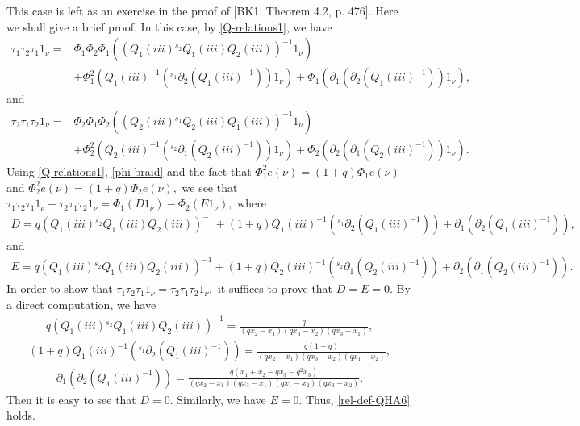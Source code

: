 \documentclass[11pt, reqno]{amsart} \textwidth=14.9cm \oddsidemargin=1cm \evensidemargin=1cm
\theoremstyle{definition}
\numberwithin{equation}{section}
\begin{document}
\vspace{0.3cm}\noindent This case is left as an exercise in the proof of [BK1, Theorem 4.2, p. 476]. Here we shall give a brief proof. In this case, by \eqref{Q-relations1}, we have
\begin{align*}
\tau_{1}\tau_{2}\tau_{1}1_{\nu}=&\Phi_{1}\Phi_{2}\Phi_{1}((Q_{1}(iii){}^{s_{2}}Q_{1}(iii)Q_{2}(iii))^{-1}1_{\nu})\\
&+\Phi_{1}^{2}(Q_{1}(iii)^{-1}({}^{s_{1}}\partial_{2}(Q_1(iii)^{-1}))1_{\nu})+\Phi_{1}(\partial_{1}(\partial_{2}(Q_1(iii)^{-1}))1_{\nu}),
\end{align*}
and
\begin{align*}
\tau_{2}\tau_{1}\tau_{2}1_{\nu}=&\Phi_{2}\Phi_{1}\Phi_{2}((Q_{2}(iii){}^{s_{1}}Q_{2}(iii)Q_{1}(iii))^{-1}1_{\nu})\\
&+\Phi_{2}^{2}(Q_{2}(iii)^{-1}({}^{s_{2}}\partial_{1}(Q_2(iii)^{-1}))1_{\nu})+\Phi_{2}(\partial_{2}(\partial_{1}(Q_2(iii)^{-1}))1_{\nu}).
\end{align*}
Using \eqref{Q-relations1}, \eqref{phi-braid} and the fact that $\Phi_{1}^{2}e(\nu)=(1+q)\Phi_{1}e(\nu)$ and $\Phi_{2}^{2}e(\nu)=(1+q)\Phi_{2}e(\nu),$ we see that $\tau_{1}\tau_{2}\tau_{1}1_{\nu}-\tau_{2}\tau_{1}\tau_{2}1_{\nu}=\Phi_{1}(D1_{\nu})-\Phi_{2}(E1_{\nu}),$
where
\begin{align*}
D=q(Q_{1}(iii){}^{s_{2}}Q_{1}(iii)Q_{2}(iii))^{-1}+(1+q)Q_{1}(iii)^{-1}({}^{s_{1}}\partial_{2}(Q_1(iii)^{-1}))
+\partial_{1}(\partial_{2}(Q_1(iii)^{-1})),
\end{align*}
and
\begin{align*}
E=q(Q_{1}(iii){}^{s_{2}}Q_{1}(iii)Q_{2}(iii))^{-1}+(1+q)Q_{2}(iii)^{-1}({}^{s_{2}}\partial_{1}(Q_2(iii)^{-1}))
+\partial_{2}(\partial_{1}(Q_2(iii)^{-1})).
\end{align*}
In order to show that $\tau_{1}\tau_{2}\tau_{1}1_{\nu}=\tau_{2}\tau_{1}\tau_{2}1_{\nu},$ it suffices to prove that $D=E=0.$ By a direct computation, we have
\begin{align*}
q(Q_{1}(iii){}^{s_{2}}Q_{1}(iii)Q_{2}(iii))^{-1}=\frac{q}{(qx_2-x_1)(qx_3-x_2)(qx_3-x_1)},
\end{align*}
\begin{align*}
(1+q)Q_{1}(iii)^{-1}({}^{s_{1}}\partial_{2}(Q_1(iii)^{-1}))=\frac{q(1+q)}{(qx_2-x_1)(qx_3-x_2)(qx_1-x_2)},
\end{align*}
\begin{align*}
\partial_{1}(\partial_{2}(Q_1(iii)^{-1}))=\frac{q(x_1+x_2-qx_3-q^{2}x_3)}{(qx_2-x_1)(qx_3-x_1)(qx_1-x_2)(qx_3-x_2)}.
\end{align*}
Then it is easy to see that $D=0.$ Similarly, we have $E=0.$ Thus, \eqref{rel-def-QHA6} holds.
\end{document}
